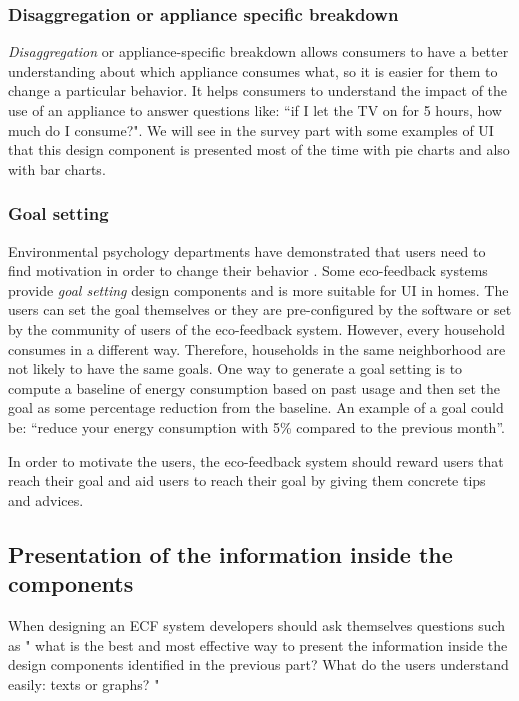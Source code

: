 \documentclass[journal]{vgtc}                %
\begin{document}
\subsubsection{Disaggregation or appliance specific breakdown}
\textit{Disaggregation} or appliance-specific breakdown allows consumers to have a better understanding about which appliance consumes what, so it is easier for them to change a particular behavior. It helps consumers to understand the impact of the use of an appliance to answer questions like: ``if I let the TV on for 5 hours, how much do I consume?".
We will see in the survey part with some examples of UI that this design component is presented most of the time with pie charts and also with bar charts.

\subsubsection{Goal setting}
Environmental psychology departments have demonstrated that users need to find motivation in order to change their behavior \cite{abrahamse2007effect}.
Some eco-feedback systems provide \textit{goal setting} design components and is more suitable for UI in homes. The users can set the goal themselves or they are pre-configured by the software or set by the community of users of the eco-feedback system. However, every household consumes in a different way. Therefore, households in the same neighborhood are not likely to have the same goals. 
One way to generate a goal setting is to compute a baseline of energy consumption based on past usage and then set the goal as some percentage reduction from the baseline. %
An example of a goal could be: ``reduce your energy consumption with 5\% compared to the previous month''.

In order to motivate the users, the eco-feedback system should reward users that reach their goal and aid users to reach their goal by giving them concrete tips and advices.

\subsection{Presentation of the information inside the components} %

When designing an ECF system developers should ask themselves questions such as " what is the best and most effective way to present the information inside the design components identified in the previous part? What do the users understand easily: texts or graphs? "
\end{document}
